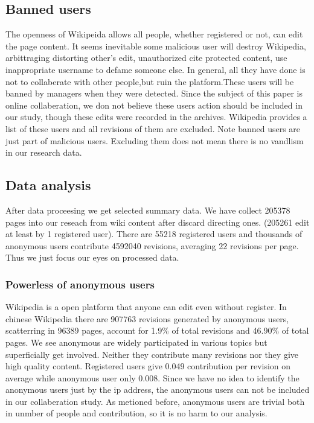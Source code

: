 \documentclass{elsarticle}
\begin{document}
\subsection{Banned users}
\label{sec:banned-users}
The openness of Wikipeida allows all people, whether registered or
not, can edit the page content. It seems inevitable some malicious
user will destroy Wikipedia, arbittraging distorting other's edit,
unauthorized cite protected content, use inappropriate username to
defame someone else. In general, all they have done is not to
collaberate with other people,but ruin the platform.These users will
be banned by managers when they were detected. Since the subject of
this paper is online collaberation, we don not believe these users
action should be included in our study, though these edits were
recorded in the archives. Wikipedia provides a list of these users\cite{badnames}\cite{bannedwikipedians} and
all revisions of them are excluded. Note banned users are just part of
malicious users. Excluding them does not mean there is no vandlism in
our research data. 

\subsection{Data analysis}
\label{sec:data-analysis}

After data proceesing we get selected summary data. We have collect 205378
pages into our reseach from wiki content after discard directing
ones. (205261 edit at least by 1 registered user). There are 55218 registered users and thousands of anonymous
users contribute 4592040 revisions, averaging  22 revisions per
page. Thus we just focus our eyes on processed data.

\subsubsection{Powerless of anonymous users}
\label{sec:powerl-anonym-users}
Wikipedia is  a open platform that anyone can edit even without
register. In chinese Wikipedia there are 907763  revisions generated
by anonymous users, scatterring in 96389 pages, account for 1.9\% of
total revisions and 46.90\% of total pages. We see anonymous are
widely participated in various topics but  superficially get
involved. Neither they contribute many revisions nor they give high
quality content. Registered users  give 0.049 contribution per
revision on average while anonymous user only 0.008.  Since we have no
idea to identify the anonymous users just by the ip address, the
anonymous users can not be included in our collaberation study. As
metioned before, anonymous users are trivial both in unmber of people
and contribution, so it is no harm to our analysis. 
\end{document}
